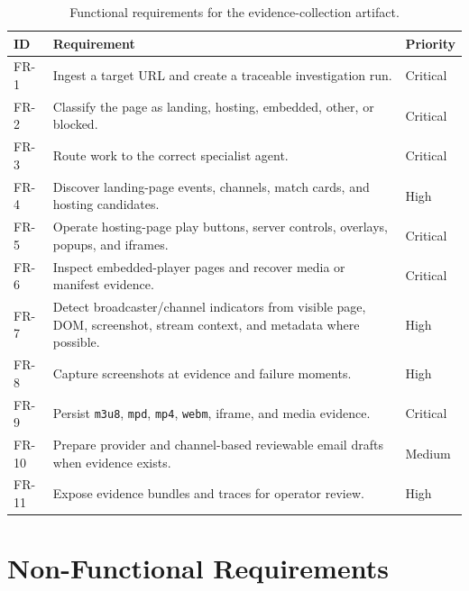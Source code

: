 \begin{table}[!htbp]
\centering
\begin{tabularx}{\textwidth}{Q{1.35cm} Y Q{2.1cm}}
\toprule
{}
ID & Requirement & Priority \\
\midrule
FR-1 & Ingest a target URL and create a traceable investigation run. & Critical \\
FR-2 & Classify the page as landing, hosting, embedded, other, or blocked. & Critical \\
FR-3 & Route work to the correct specialist agent. & Critical \\
FR-4 & Discover landing-page events, channels, match cards, and hosting candidates. & High \\
FR-5 & Operate hosting-page play buttons, server controls, overlays, popups, and iframes. & Critical \\
FR-6 & Inspect embedded-player pages and recover media or manifest evidence. & Critical \\
FR-7 & Detect broadcaster/channel indicators from visible page, DOM, screenshot, stream context, and metadata where possible. & High \\
FR-8 & Capture screenshots at evidence and failure moments. & High \\
FR-9 & Persist \texttt{m3u8}, \texttt{mpd}, \texttt{mp4}, \texttt{webm}, iframe, and media evidence. & Critical \\
FR-10 & Prepare provider and channel-based reviewable email drafts when evidence exists. & Medium \\
FR-11 & Expose evidence bundles and traces for operator review. & High \\
\bottomrule
\end{tabularx}
\caption{Functional requirements for the evidence-collection artifact.}
\label{tab:fr-summary}
\end{table}

\section{Non-Functional Requirements}

